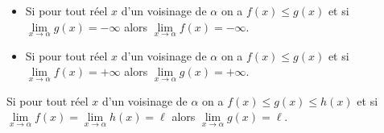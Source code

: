 %
%



\begin{thr} 
\begin{itemize}
\item Si pour tout réel $x$ d'un voisinage de $\alpha$ on a  $f(x)\leqslant g(x)$ et si $\lim\limits_{x\to \alpha}g(x)=-\infty$ alors $\lim\limits_{x\to \alpha}f(x)=-\infty$.
\item Si pour tout réel $x$ d'un voisinage de $\alpha$ on a  $f(x)\leqslant g(x)$ et si $\lim\limits_{x\to \alpha}f(x)=+\infty$  alors $\lim\limits_{x\to \alpha}g(x)=+\infty$.
\end{itemize}
\end{thr}

\begin{thr}[name=Théorème des gendarmes]
Si pour tout réel $x$ d'un voisinage de $\alpha$ on a  $f(x)\leqslant g(x) \leqslant h(x)$ et si $\lim\limits_{x\to \alpha}f(x)=\lim\limits_{x\to \alpha}h(x)=\ell$ alors $\lim\limits_{x\to \alpha}g(x)=\ell$.
\end{thr}

